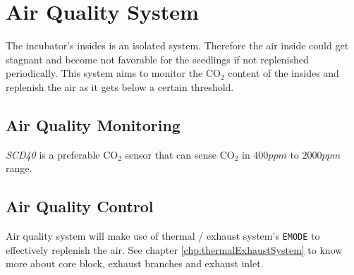 \documentclass[../../main]{subfiles}
\begin{document}
\section{Air Quality System} \label{sec:}

The incubator's insides is an isolated system. Therefore the air inside could get
stagnant and become not favorable for the seedlings if not replenished periodically.
This system aims to monitor the $\mbox{CO}_2$ content of the insides and replenish
the air as it gets below a certain threshold.

\subsection{Air Quality Monitoring}

\emph{SCD40} is a preferable $\mbox{CO}_2$ sensor that can sense $\mbox{CO}_2$ in
$400\si{ppm}$ to $2000\si{ppm}$ range.


\subsection{Air Quality Control}

Air quality system will make use of thermal / exhaust system's \texttt{EMODE} to
effectively replenish the air. See chapter \ref{chp:thermalExhaustSystem} to know
more about core block, exhaust branches and exhaust inlet.
\end{document}
